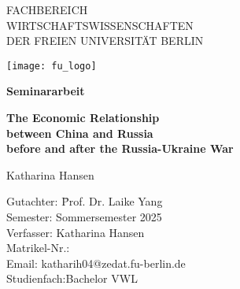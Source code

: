 \thispagestyle{empty}

\begin{center}

\vspace*{-10mm}

{\LARGE FACHBEREICH \\WIRTSCHAFTSWISSENSCHAFTEN\\[1mm]}
DER FREIEN UNIVERSITÄT BERLIN\\

\vspace*{1cm}

\texttt{[image: fu\_logo]}

\vspace*{1cm}

{\Large \textbf{Seminararbeit}}\\ 

\vspace{1cm}

{\Large \textbf{The Economic Relationship}}\\ 
\vspace*{1mm}
{\Large \textbf{between China and Russia}}\\ 
\vspace*{1mm}
{\Large \textbf{before and after the Russia-Ukraine War}}\\

\vspace{1.5cm}

{\LARGE Katharina Hansen}\\[15mm]

\parbox{120mm}{
\begin{large}
\begin{tabbing}
Gutachter: \hspace{.7cm} \=Prof. Dr. Laike Yang\\[4mm]
Semester:\> Sommersemester 2025\\
Verfasser:\> Katharina Hansen\\ %
Matrikel-Nr.:\\
Email:\> katharih04@zedat.fu-berlin.de\\
Studienfach:\>Bachelor VWL\\[8mm]
\end{tabbing}
\end{large}
}

\end{center}
\clearpage{\pagestyle{empty}\cleardoublepage}
